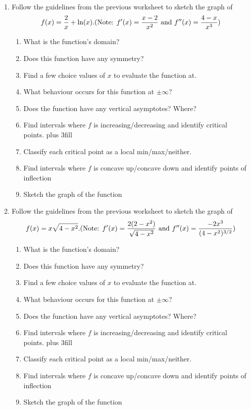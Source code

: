 \documentclass[11pt,fleqn]{article}
\begin{document}
\begin{center}
  \Large{}\\
\end{center}

\begin{enumerate}
\item Follow the guidelines from the previous worksheet
 to sketch the graph of
\[
f(x)= \frac{2}{x}+\ln(x). \hfill (\text{Note: } f'(x)=\frac{x-2}{x^2} \text{  and } f''(x)=\frac{4-x}{x^3})
\]

\begin{enumerate}
\item What is the function's domain?
\vfill
\item Does this function have any symmetry?
\vfill
\item Find a few choice values of $x$ to evaluate the function at.
\vfill
\item What behaviour occurs for this function at $\pm \infty$?
\vfill
\item Does the function have any vertical asymptotes?  Where?
\vfill
\item Find intervals where $f$ is increasing/decreasing and 
identify critical points.
\vskip 0pt plus 3fill
\newpage
\item Classify each critical point as a local min/max/neither.
\vskip 1in
\item Find intervals where $f$ is concave up/concave down and identify
points of inflection
\vfill
\item Sketch the graph of the function
\vfill
\newpage
\end{enumerate}

\newpage
\item Follow the guidelines from the previous worksheet
 to sketch the graph of
\[
f(x)=x\sqrt{4-x^2}.  \hfill (\text{Note: } f'(x)=\frac{2(2-x^2)}{\sqrt{4-x^2}} \text{  and } f''(x)=\frac{-2x^3}{(4-x^2)^{3/2}})
\]
\begin{enumerate}
\item What is the function's domain?
\vfill
\item Does this function have any symmetry?
\vfill
\item Find a few choice values of $x$ to evaluate the function at.
\vfill
\item What behaviour occurs for this function at $\pm \infty$?
\vfill
\item Does the function have any vertical asymptotes?  Where?
\vfill
\item Find intervals where $f$ is increasing/decreasing and 
identify critical points.
\vskip 0pt plus 3fill
\newpage
\item Classify each critical point as a local min/max/neither.
\vskip 1in
\item Find intervals where $f$ is concave up/concave down and identify
points of inflection
\vfill
\item Sketch the graph of the function
\vfill
\newpage
\end{enumerate}


\end{enumerate}
\end{document}
